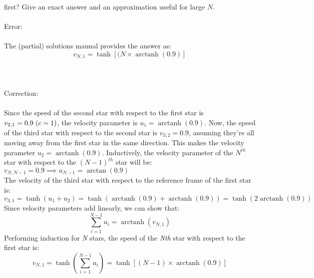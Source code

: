 \documentclass{report}
\DeclareMathOperator{\arctanh}{arctanh}
\begin{document}
first? Give an exact answer and an approximation useful for large $N$.\\\\
Error:\\\\
The (partial) solutions manual provides the answer as:
\begin{equation}
	 	v_{N,1} = \tanh[(N\times\arctanh(0.9)]
\end{equation}\\\\\\
Correction:\\\\
Since the speed of the second star with respect to the first star is $v_{2,1} = 0.9 \hspace{3 pt}(c = 1)$, the velocity parameter is $u_{1} = \arctanh(0.9)$. Now, the speed of the third star with respect to the second star is $v_{3,2} = 0.9$, assuming they're all moving away from the first star in the same direction. This makes the velocity parameter $u_{2} = \arctanh(0.9)$. Inductively, the velocity parameter of the $N^{th}$ star with respect to the $(N-1)^{th}$ star will be: $v_{N,N-1} = 0.9 \implies u_{N-1} = \arctan(0.9)$ \\ 
	The velocity of the third star with respect to the reference frame of the first star is:
	\begin{equation}
	 	v_{3,1} = \tanh(u_{1}+u_{2}) = \tanh(\arctanh(0.9)+\arctanh(0.9)) = \tanh(2\arctanh(0.9))
	\end{equation}
	Since velocity parameters add linearly, we can show that:
	\begin{equation}
		\displaystyle\sum_{i=1}^{N-1}u_{i} = \arctanh(v_{N,1})
	\end{equation}
	Performing induction for {\em N} stars, the speed of the {\em Nth} star with respect to the first star is:
	\begin{equation}
	 	v_{N,1} = \tanh\left(\displaystyle\sum_{i=1}^{N-1}u_{i}\right)= \tanh[(N-1)\times\arctanh(0.9)]
	\end{equation} 
\end{document}
